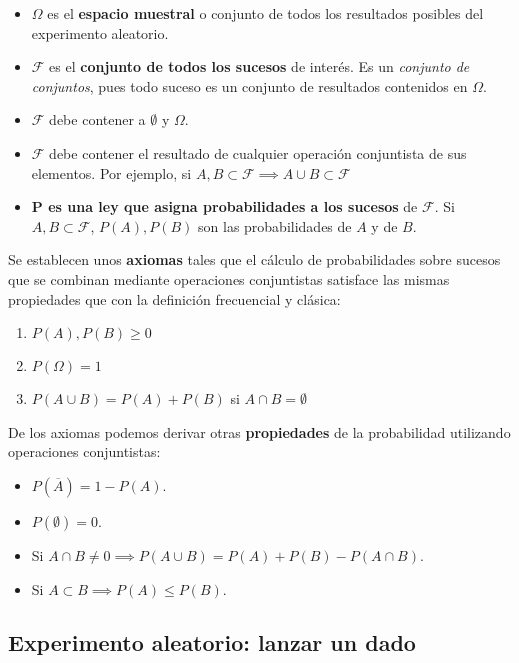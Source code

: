 \documentclass[11pt]{article}
\providecommand{\tightlist}{%
      \setlength{\itemsep}{0pt}\setlength{\parskip}{0pt}}
\begin{document}
\begin{itemize}
\tightlist
\item
  \(\Omega\) es el \textbf{espacio muestral} o conjunto de todos los
  resultados posibles del experimento aleatorio.
\item
  \(\mathscr{F}\) es el \textbf{conjunto de todos los sucesos} de
  interés. Es un \emph{conjunto de conjuntos}, pues todo suceso es un
  conjunto de resultados contenidos en \(\Omega\).
\item
  \(\mathscr{F}\) debe contener a \(\emptyset\) y \(\Omega\).
\item
  \(\mathscr{F}\) debe contener el resultado de cualquier operación
  conjuntista de sus elementos. Por ejemplo, si
  \(A, B \subset \mathscr{F} \implies A \cup B \subset \mathscr{F}\)
\item
  \textbf{P es una ley que asigna probabilidades a los sucesos} de
  \(\mathscr{F}\). Si \(A, B \subset \mathscr{F}\), \(P(A), P(B)\) son
  las probabilidades de \(A\) y de \(B\).
\end{itemize}

    Se establecen unos \textbf{axiomas} tales que el cálculo de
probabilidades sobre sucesos que se combinan mediante operaciones
conjuntistas satisface las mismas propiedades que con la definición
frecuencial y clásica: 
\begin{enumerate}
\item \(P(A), P(B)\geq 0\) 
\item \(P(\Omega)=1\) 
\item \(P(A \cup B) = P(A)+P(B)\) si \(A \cap B = \emptyset\)
\end{enumerate}

De los axiomas podemos derivar otras \textbf{propiedades} de la
probabilidad utilizando operaciones conjuntistas: 
\begin{itemize}
\item
\(P(\overline A) = 1 - P(A)\). 
\item \(P(\emptyset) = 0\). 
\item Si
\(A\cap B \neq 0\implies P(A\cup B) =P(A)+P(B)-P(A\cap B)\). 
\item Si
\(A\subset B \implies P(A) \leq P(B)\).
\end{itemize}

    \subsection*{Experimento aleatorio: lanzar un
dado}\label{experimento-aleatorio-lanzar-un-dado}
\end{document}
